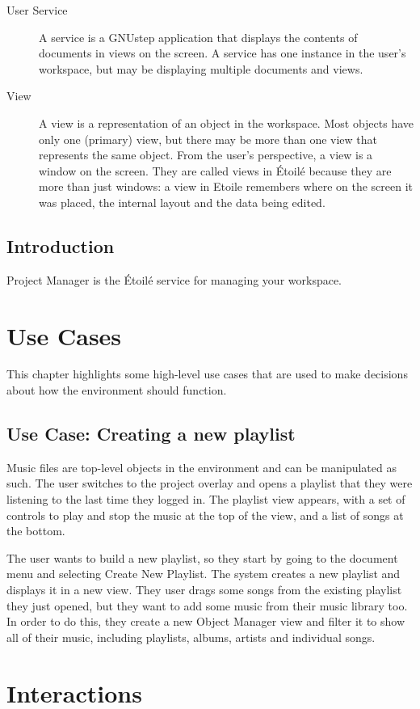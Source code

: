 \documentclass[11pt]{report}
\newcommand{\etoile}{\'Etoil\'e\xspace}
\begin{document}
\begin{description}
\item[User Service] A service is a GNUstep application that displays the contents of documents in views on the screen. A service has one instance in the user's workspace, but may be displaying multiple documents and views.
\item[View] A view is a representation of an object in the workspace. Most objects have only one (primary) view, but there may be more than one view that represents the same object. From the user's perspective, a view is a window on the screen. They are called views in \etoile because they are more than just windows: a view in Etoile remembers where on the screen it was placed, the internal layout and the data being edited.
\end{description}

\section{Introduction}
Project Manager is the \etoile service for managing your workspace.

\chapter{Use Cases}
This chapter highlights some high-level use cases that are used to make decisions about how the environment should function.

\section{Use Case: Creating a new playlist}
Music files are top-level objects in the environment and can be manipulated as such. The user switches to the project overlay and opens a playlist that they were listening to the last time they logged in. The playlist view appears, with a set of controls to play and stop the music at the top of the view, and a list of songs at the bottom.

The user wants to build a new playlist, so they start by going to the document menu and selecting Create New Playlist. The system creates a new playlist and displays it in a new view. They user drags some songs from the existing playlist they just opened, but they want to add some music from their music library too. In order to do this, they create a new Object Manager view and filter it to show all of their music, including playlists, albums, artists and individual songs.

\chapter{Interactions}
\end{document}
